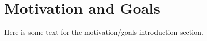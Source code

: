 \section{Motivation and Goals}
\label{sec:introduction:motivation}

Here is some text for the motivation/goals introduction section.

